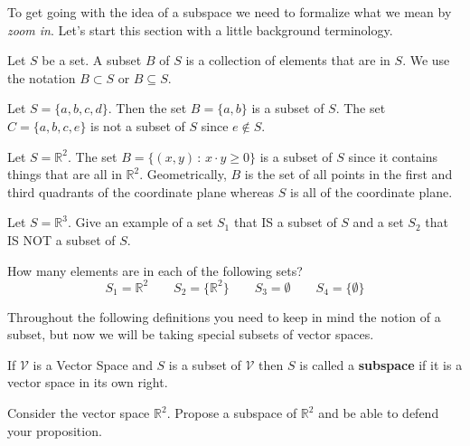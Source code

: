 To get going with the idea of a subspace we need to formalize what we mean by {\it zoom
in}.  Let's start this section with a little background terminology.
\begin{definition}[Subset]
    Let $S$ be a set.  A subset $B$ of $S$ is a collection of elements that are in $S$.
    We use the notation $B \subset S$ or $B \subseteq S$.
\end{definition}
\begin{example}
    Let $S = \{ a,b,c,d\}$.  Then the set $B = \{a,b\}$ is a subset of $S$.  The set $C =
    \{ a,b,c,e\}$ is not a subset of $S$ since $e \not\in S$.  
\end{example}

\begin{example}
    Let $S = \mathbb{R}^2$.  The set $B = \{ (x,y) \, : \, x \cdot y \ge 0 \}$ is a subset
    of $S$ since it contains things that are all in $\mathbb{R}^2$.  Geometrically, $B$ is
    the set of all points in the first and third quadrants of the coordinate plane whereas
    $S$ is all of the coordinate plane.
\end{example}

\begin{problem}
    Let $S = \mathbb{R}^3$.  Give an example of a set $S_1$ that IS a subset of $S$ and a
    set $S_2$ that IS NOT a subset of $S$.
\end{problem}

\begin{problem}
    How many elements are in each of the following sets?
    \[ S_1 = \mathbb{R}^2 \qquad S_2 = \{ \mathbb{R}^2 \} \qquad S_3 = \emptyset \qquad
    S_4 = \{ \emptyset \} \]
\end{problem}

Throughout the following definitions you need to keep in mind the notion of a subset, but
now we will be taking special subsets of vector spaces.
\begin{definition}[Subspace]
    If $\mathcal{V}$ is a Vector Space and $S$ is a subset of $\mathcal{V}$
    then $S$ is called a {\bf subspace} if it is a vector space in its own right.
\end{definition}

\begin{problem}
    Consider the vector space $\mathbb{R}^2$.  Propose a subspace of $\mathbb{R}^2$ and be
    able to defend your proposition.
\end{problem}


